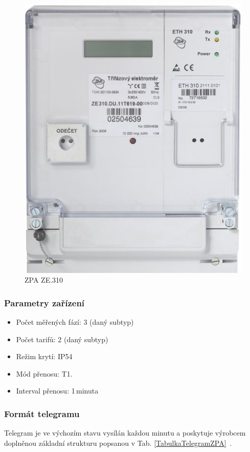 	 \begin{figure}[!h]
  \begin{center}
    \includegraphics[scale=0.35]{obrazky/zarizeni_zpa}
  \end{center}
	\vspace{-20pt}
  \caption{ZPA ZE.310~\cite{CidloZpa}}
	\vspace{-30pt}
\end{figure}


\subsubsection{Parametry zařízení}
\begin{itemize}
	\item Počet měřených fází: 3 (daný subtyp)
	\item Počet tarifů: 2 (daný subtyp)
	\item Režim krytí: IP54
	\item Mód přenosu: T1.
	\item Interval přenosu: 1\,minuta 
\end{itemize}

\subsubsection{Formát telegramu}
Telegram je ve výchozím stavu vysílán každou minutu a poskytuje výrobcem doplněnou základní strukturu popsanou v Tab. \ref{TabulkaTelegramZPA}~\cite{CidloZpa}.

